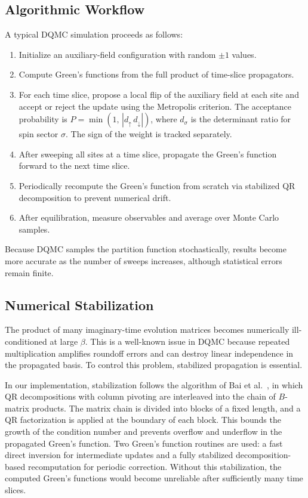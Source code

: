 \documentclass[9pt,a4paper,twocolumn,twoside]{rho-class/rho}
\begin{document}
\subsection{Algorithmic Workflow}

A typical DQMC simulation proceeds as follows:

\begin{enumerate}
\item Initialize an auxiliary-field configuration with random $\pm 1$ values.
\item Compute Green's functions from the full product of time-slice propagators.
\item For each time slice, propose a local flip of the auxiliary field at each site and accept or reject the update using the Metropolis criterion. The acceptance probability is $P = \min(1,\, |d_\uparrow\, d_\downarrow|)$, where $d_\sigma$ is the determinant ratio for spin sector $\sigma$. The sign of the weight is tracked separately.
\item After sweeping all sites at a time slice, propagate the Green's function forward to the next time slice.
\item Periodically recompute the Green's function from scratch via stabilized QR decomposition to prevent numerical drift.
\item After equilibration, measure observables and average over Monte Carlo samples.
\end{enumerate}

Because DQMC samples the partition function stochastically, results become more accurate as the number of sweeps increases, although statistical errors remain finite.

\subsection{Numerical Stabilization}

The product of many imaginary-time evolution matrices becomes numerically ill-conditioned at large $\beta$. This is a well-known issue in DQMC because repeated multiplication amplifies roundoff errors and can destroy linear independence in the propagated basis. To control this problem, stabilized propagation is essential.

In our implementation, stabilization follows the algorithm of Bai et al.\ \cite{bai2009}, in which QR decompositions with column pivoting are interleaved into the chain of $B$-matrix products. The matrix chain is divided into blocks of a fixed length, and a QR factorization is applied at the boundary of each block. This bounds the growth of the condition number and prevents overflow and underflow in the propagated Green's function. Two Green's function routines are used: a fast direct inversion for intermediate updates and a fully stabilized decomposition-based recomputation for periodic correction. Without this stabilization, the computed Green's functions would become unreliable after sufficiently many time slices.
\end{document}

